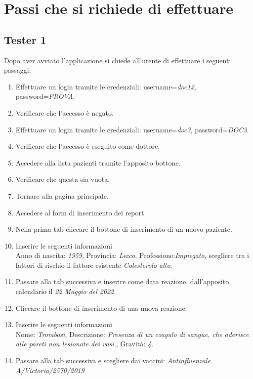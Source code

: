 \documentclass{article}
\begin{document}
\section{Passi che si richiede di effettuare}

    \subsection*{Tester 1}
    Dopo aver avviato l'applicazione si chiede all'utente di effettuare i seguenti passaggi:
    \begin{enumerate}
        \item Effettuare un login tramite le credenziali: username=\textit{doc12}, password=\textit{PROVA}.
        \item Verificare che l'accesso è negato.
        \item Effettuare un login tramite le credenziali: username=\textit{doc3}, password=\textit{DOC3}.
        \item Verificare che l'accesso è eseguito come dottore.
        \item Accedere alla lista pazienti tramite l'apposito bottone.
        \item Verificare che questa sia vuota.
        \item Tornare alla pagina principale.
        \item Accedere al form di inserimento dei report
        \item Nella prima tab cliccare il bottone di inserimento di un nuovo paziente.
        \item Inserire le seguenti informazioni\\
                Anno di nascita: \textit{1959}, Provincia: \textit{Lecco}, Professione:\textit{Impiegato}, scegliere tra i fattori di rischio il fattore esistente \textit{Colesterolo alto}.
        \item Passare alla tab successiva e inserire come data reazione, dall'apposito calendario il \textit{22 Maggio del 2022}.
        \item Cliccare il bottone di inserimento di una nuova reazione.
        \item Inserire le seguenti informazioni\\ 
                Nome: \textit{Trombosi}, Descrizione: \textit{Presenza di un coagulo di sangue, che aderisce alle pareti non lesionate dei vasi.}, Gravità: \textit{4}.
        \item Passare alla tab successiva e scegliere dai vaccini: \textit{Antinfluenzale A/Victoria/2570/2019}

\end{enumerate}
\end{document}

